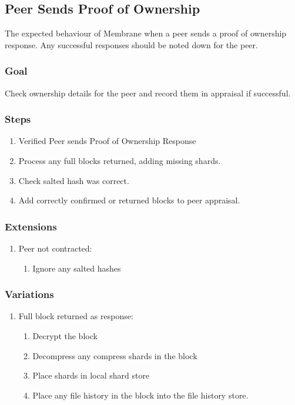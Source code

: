 \documentclass[11pt, a4paper, twoside]{report}
\begin{document}
\subsection{Peer Sends Proof of Ownership}

The expected behaviour of Membrane when a peer sends a proof of ownership response. Any successful responses should be noted down for the peer.

\subsubsection{Goal}

Check ownership details for the peer and record them in appraisal if successful.

\subsubsection{Steps}

\begin{enumerate}
 \item Verified Peer sends Proof of Ownership Response
 \item Process any full blocks returned, adding missing shards.
 \item Check salted hash was correct.
 \item Add correctly confirmed or returned blocks to peer appraisal.
\end{enumerate}

\subsubsection{Extensions}
\begin{enumerate}
  \item Peer not contracted:
	\begin{enumerate}
	  \item Ignore any salted hashes
	\end{enumerate}
\end{enumerate}

\subsubsection{Variations}
\begin{enumerate}
  \item Full block returned as response:
	\begin{enumerate}
	  \item Decrypt the block
	  \item Decompress any compress shards in the block
	  \item Place shards in local shard store
	  \item Place any file history in the block into the file history store.
	\end{enumerate}
\end{enumerate}
\end{document}
